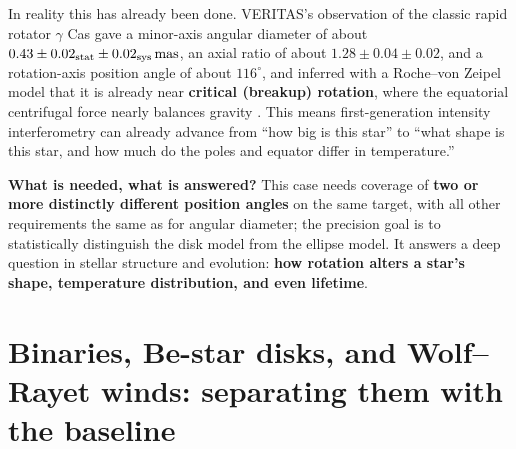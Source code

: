 In reality this has already been done. VERITAS's observation of the classic rapid rotator \(\gamma\) Cas gave a minor-axis angular diameter of about \(0.43\pm0.02_{\rm stat}\pm0.02_{\rm sys}\,\mathrm{mas}\), an axial ratio of about \(1.28\pm0.04\pm0.02\), and a rotation-axis position angle of about \(116^\circ\), and inferred with a Roche--von Zeipel model that it is already near \textbf{critical (breakup) rotation}, where the equatorial centrifugal force nearly balances gravity \citep{2025ApJ...995..191A}. This means first-generation intensity interferometry can already advance from ``how big is this star'' to ``what shape is this star, and how much do the poles and equator differ in temperature.''

\textbf{What is needed, what is answered?} This case needs coverage of \textbf{two or more distinctly different position angles} on the same target, with all other requirements the same as for angular diameter; the precision goal is to statistically distinguish the disk model from the ellipse model. It answers a deep question in stellar structure and evolution: \textbf{how rotation alters a star's shape, temperature distribution, and even lifetime}.

\section{Binaries, Be-star disks, and Wolf--Rayet winds: separating them with the baseline}
\label{sec:e25-binary}

